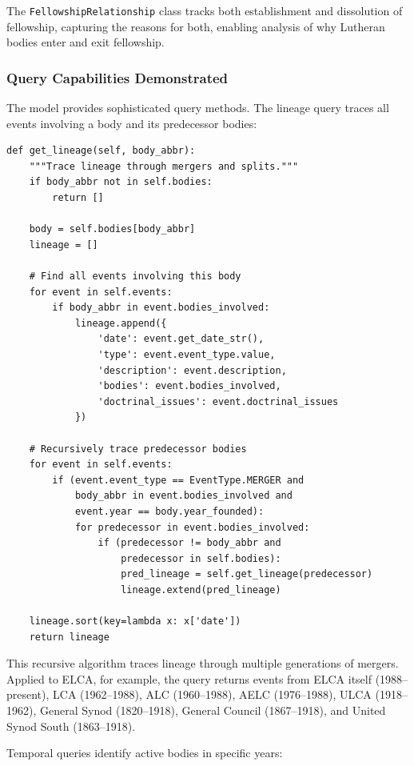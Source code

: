 The \texttt{FellowshipRelationship} class tracks both establishment and dissolution of fellowship, capturing the reasons for both, enabling analysis of why Lutheran bodies enter and exit fellowship.

\subsubsection{Query Capabilities Demonstrated}

The model provides sophisticated query methods. The lineage query traces all events involving a body and its predecessor bodies:

\begin{verbatim}
def get_lineage(self, body_abbr):
    """Trace lineage through mergers and splits."""
    if body_abbr not in self.bodies:
        return []

    body = self.bodies[body_abbr]
    lineage = []

    # Find all events involving this body
    for event in self.events:
        if body_abbr in event.bodies_involved:
            lineage.append({
                'date': event.get_date_str(),
                'type': event.event_type.value,
                'description': event.description,
                'bodies': event.bodies_involved,
                'doctrinal_issues': event.doctrinal_issues
            })

    # Recursively trace predecessor bodies
    for event in self.events:
        if (event.event_type == EventType.MERGER and
            body_abbr in event.bodies_involved and
            event.year == body.year_founded):
            for predecessor in event.bodies_involved:
                if (predecessor != body_abbr and
                    predecessor in self.bodies):
                    pred_lineage = self.get_lineage(predecessor)
                    lineage.extend(pred_lineage)

    lineage.sort(key=lambda x: x['date'])
    return lineage
\end{verbatim}

This recursive algorithm traces lineage through multiple generations of mergers. Applied to ELCA, for example, the query returns events from ELCA itself (1988--present), LCA (1962--1988), ALC (1960--1988), AELC (1976--1988), ULCA (1918--1962), General Synod (1820--1918), General Council (1867--1918), and United Synod South (1863--1918).

Temporal queries identify active bodies in specific years:

